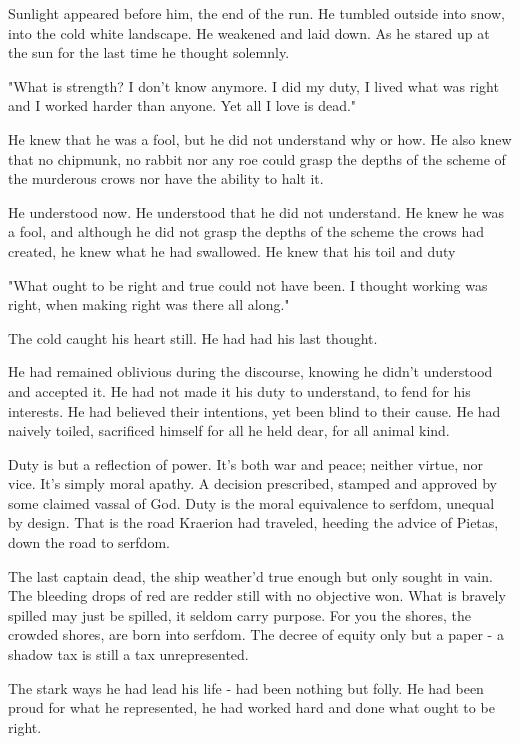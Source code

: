 \documentclass[smalldemyvopaper,11pt,twoside,onecolumn,openright,extrafontsizes]{memoir}
\newlength\drop
\begin{document}
Sunlight appeared before him, the end of the run. He tumbled outside into snow, into the cold white landscape. He weakened and laid down. As he stared up at the sun for the last time he thought solemnly.

"What is strength? I don't know anymore. I did my duty, I lived what was right and I worked harder than anyone. Yet all I love is dead."

He knew that he was a fool, but he did not understand why or how. He also knew that no chipmunk, no rabbit nor any roe could grasp the depths of the scheme of the murderous crows nor have the ability to halt it.

He understood now. He understood that he did not understand. He knew he was a fool, and although he did not grasp the depths of the scheme the crows had created, he knew what he had swallowed. He knew that his toil and duty

"What ought to be right and true could not have been. I thought working was right, when making right was there all along."

The cold caught his heart still. He had had his last thought. 

He had remained oblivious during the discourse, knowing he didn't understood and accepted it. He had not made it his duty to understand, to fend for his interests. He had believed their intentions, yet been blind to their cause. He had naively toiled, sacrificed himself for all he held dear, for all animal kind. 

Duty is but a reflection of power. It's both war and peace; neither virtue, nor vice. It's simply moral apathy. A decision prescribed, stamped and approved by some claimed vassal of God. Duty is the moral equivalence to serfdom, unequal by design. That is the road Kraerion had traveled, heeding the advice of Pietas, down the road to serfdom.

The last captain dead, the ship weather'd true enough but only sought in vain. The bleeding drops of red are redder still with no objective won. What is bravely spilled may just be spilled, it seldom carry purpose. For you the shores, the crowded shores, are born into serfdom. The decree of equity only but a paper - a shadow tax is still a tax unrepresented.

The stark ways he had lead his life - had been nothing but folly. He had been proud for what he represented, he had worked hard and done what ought to be right. 

\newpage
\end{document}
